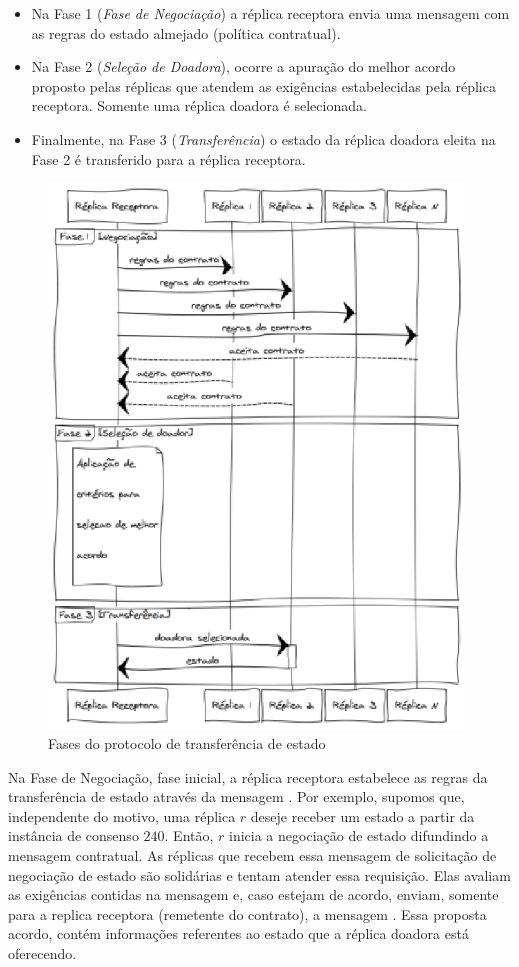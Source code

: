 \begin{itemize}
  \item Na Fase 1 (\emph{Fase de Negociação}) a réplica receptora envia uma mensagem com
    as regras do estado almejado (política contratual).
  \item Na Fase 2 (\emph{Seleção de Doadora}), ocorre a apuração do melhor acordo proposto
    pelas réplicas que atendem as exigências estabelecidas pela réplica receptora. Somente
    uma réplica doadora é selecionada.
  \item Finalmente, na Fase 3 (\emph{Transferência}) o estado da réplica doadora eleita na
    Fase 2 é transferido para a réplica receptora.
\end{itemize}

\begin{figure}[ht]
  \centering
  \includegraphics[width=11cm]{conteudo/capitulos/figuras/fases_protocolo.eps}
  \caption{Fases do protocolo de transferência de estado}
  \label{fig:fases_protocolo}
\end{figure}

Na Fase de Negociação, fase inicial, a réplica receptora estabelece as regras da
transferência de estado através da mensagem . Por exemplo,
supomos que, independente do motivo, uma réplica $r$ deseje receber um estado a partir da
instância de consenso $240$. Então, $r$ inicia a negociação de estado difundindo a
mensagem contratual. As réplicas que recebem essa mensagem de solicitação de negociação de
estado são solidárias e tentam atender essa requisição. Elas avaliam as exigências
contidas na mensagem e, caso estejam de acordo, enviam, somente para a replica receptora
(remetente do contrato), a mensagem . Essa proposta acordo, contém
informações referentes ao estado que a réplica doadora está oferecendo.

